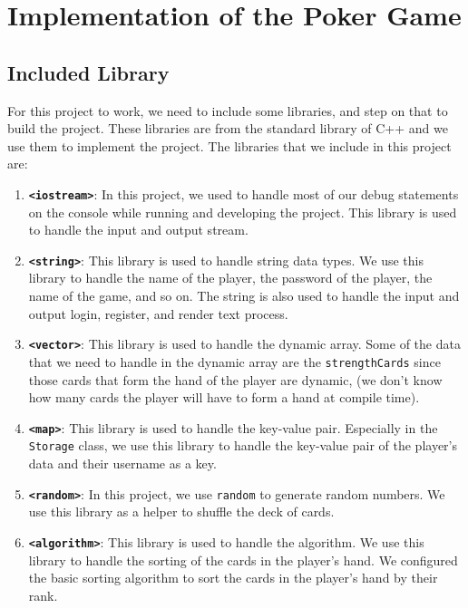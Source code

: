 \section{Implementation of the Poker Game}
\label{sec:implementation-of-the-poker-game}

\subsection{Included Library}
\label{subsec:included-library}

\hspace{1cm} For this project to work, we need to include some libraries, and step on that to build the project. These libraries are from the standard library of C++ and we use them to implement the project. The libraries that we include in this project are:
\begin{enumerate}
    \item \textbf{\texttt{<iostream>}}: In this project, we used to handle most of our debug statements on the console while running and developing the project. This library is used to handle the input and output stream.
    \item \textbf{\texttt{<string>}}: This library is used to handle string data types. We use this library to handle the name of the player, the password of the player, the name of the game, and so on. The string is also used to handle the input and output login, register, and render text process.
    \item \textbf{\texttt{<vector>}}: This library is used to handle the dynamic array. Some of the data that we need to handle in the dynamic array are the \texttt{strengthCards} since those cards that form the hand of the player are dynamic, (we don't know how many cards the player will have to form a hand at compile time).
    \item \textbf{\texttt{<map>}}: This library is used to handle the key-value pair. Especially in the \texttt{Storage} class, we use this library to handle the key-value pair of the player's data and their username as a key.
    \item \textbf{\texttt{<random>}}: In this project, we use \texttt{random} to generate random numbers. We use this library as a helper to shuffle the deck of cards.
    \item \textbf{\texttt{<algorithm>}}: This library is used to handle the algorithm. We use this library to handle the sorting of the cards in the player's hand. We configured the basic sorting algorithm to sort the cards in the player's hand by their rank.

\end{enumerate}
